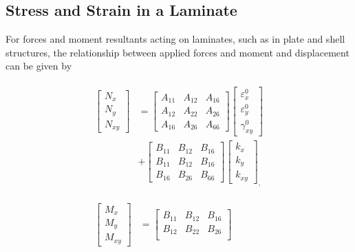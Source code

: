 \subsection{Stress and Strain in a Laminate}
For forces and moment resultants acting on laminates, such as in plate and shell
structures, the relationship between applied forces and moment and displacement
can be given by

\begin{equation} \label{eq:force_and_moments}
	\begin{array}{l}
		\begin{aligned}
	\begin{bmatrix}
		N_x \\
		N_y \\
		N_{xy}
	\end{bmatrix}
	&=
	\begin{bmatrix}
		A_{11} & A_{12} & A_{16} \\
		A_{12} & A_{22} & A_{26} \\
		A_{16} & A_{26} & A_{66} 
	\end{bmatrix}
    \begin{bmatrix}
		\varepsilon_x^0 \\
        \varepsilon_y^0 \\
		\gamma_{xy}^0
    \end{bmatrix}   \\
	&+               
	\begin{bmatrix}
		B_{11} & B_{12} & B_{16} \\
		B_{11} & B_{12} & B_{16} \\
		B_{16} & B_{26} & B_{66} 
	\end{bmatrix}
	\begin{bmatrix}
		k_x \\
		k_y \\
		k_{xy} 
	\end{bmatrix}_{\textstyle ,}  \\
\end{aligned} \\ \\
\begin{aligned}
	\begin{bmatrix}
		M_x \\
		M_y \\
		M_{xy}
	\end{bmatrix}
	&=
	\begin{bmatrix}
		B_{11} & B_{12} & B_{16} \\
		B_{12} & B_{22} & B_{26} \\

\end{bmatrix}
\end{aligned}
\end{array}
\end{equation}
